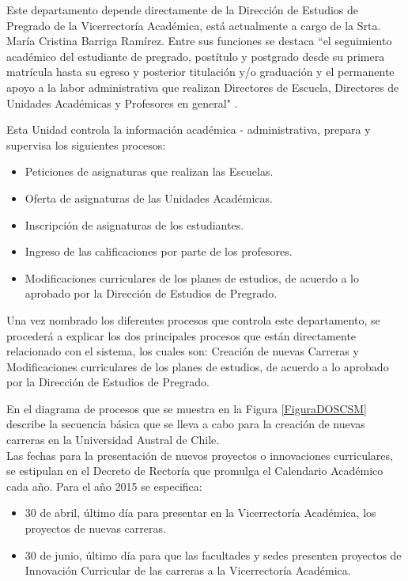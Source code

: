 		Este departamento depende directamente de la Dirección de Estudios de Pregrado de la Vicerrectoría Académica, está actualmente a cargo de la Srta. María Cristina Barriga Ramírez. Entre sus funciones se destaca ``el seguimiento académico del estudiante de pregrado, postítulo y postgrado desde su primera matrícula hasta su egreso y posterior titulación y/o graduación y el permanente apoyo a la labor administrativa que realizan Directores de Escuela, Directores de Unidades Académicas y Profesores en general"\hspace{0.2cm} \cite{Dir15}.
		
		
		
		
		
		
		
		Esta Unidad  controla la información académica - administrativa, prepara y supervisa los siguientes procesos:
		\begin{itemize}
			\item Peticiones de asignaturas que realizan las Escuelas.
			\item Oferta de asignaturas de las Unidades Académicas.
			\item Inscripción de asignaturas de los estudiantes.
			\item Ingreso de las calificaciones por parte de los profesores.
			\item Modificaciones curriculares de los planes de estudios, de acuerdo  a lo aprobado por la Dirección de Estudios de Pregrado.
			
		\end{itemize}
		
		
		Una vez nombrado los diferentes procesos que controla este departamento, se procederá a explicar los dos  principales procesos que están directamente relacionado con el sistema, los cuales son: Creación de nuevas Carreras y  Modificaciones curriculares de los planes de estudios, de acuerdo  a lo aprobado por la Dirección de Estudios de Pregrado.
		
		
		En el diagrama de procesos que se muestra en la Figura \ref{FiguraDOSCSM} describe la secuencia básica que se lleva a cabo para la creación de nuevas carreras en la Universidad Austral de Chile.
\\
		
		Las fechas para la presentación de nuevos proyectos o innovaciones curriculares, se estipulan en el Decreto de Rectoría  que promulga el Calendario Académico cada año. Para el año 2015 se especifica:
			\begin{itemize}
			\item 30 de abril, último día para presentar en la Vicerrectoría Académica, los proyectos de nuevas carreras.
			\item 30 de junio, último día para que las facultades y sedes presenten proyectos de Innovación Curricular de las carreras a la Vicerrectoría Académica.
		\end{itemize}
		
